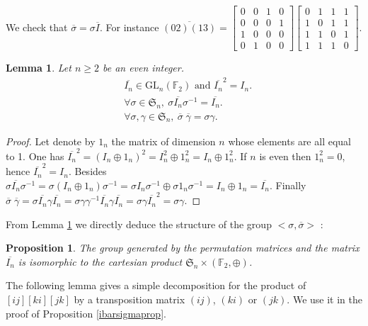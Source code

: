 \documentclass[a4paper,12pt,fleqn]{article}
\newcommand\F{\mathbb{F}}
\newcommand\SYM[1][n]{\mathfrak{S}_{#1}}
\newcommand\GL[1][n]{\mathrm{GL}_{#1}(\mathbb{F}_2)}
\renewcommand\geq{\geqslant}
\newtheorem{prop}[theo]{Proposition}
\newtheorem{lem}[theo]{Lemma}
\begin{document}
We check that $\overline{\sigma}=\sigma\overline{I}$. For instance $\overline{(02)(13)}=\begin{bmatrix}0&0&1&0\\0&0&0&1\\1&0&0&0\\0&1&0&0\end{bmatrix}\begin{bmatrix}0&1&1&1\\1&0&1&1\\1&1&0&1\\1&1&1&0\end{bmatrix}$.


\begin{lem}\label{ibar1}Let $n\geq  2$ be an even integer.  
  \begin{align}
    &\overline{I_n}\in\GL \text{ and } \overline{I_n}^2=I_n.\label{ibarinv}\\
    &\forall\sigma\in\SYM,\ \sigma\overline{I_n}\sigma^{-1}=\overline{I_n}.\label{ibarconj}\\
    &\forall\sigma,\gamma\in\SYM,\ \overline{\sigma}\;\overline{\gamma}=\sigma\gamma.\label{ibarprod}
  \end{align}
\end{lem}


\begin{proof}Let denote by $1_n$ the matrix of dimension $n$ whose elements are all equal to 1. One has
  $\overline{I_n}^2=(I_n\oplus 1_n)^2=I_n^2\oplus 1_n^2=I_n\oplus 1_n^2$. If $n$ is even then $1_n^2=0$, hence
  $\overline{I_n}^2=I_n.$
  Besides $\sigma\overline{I_n}\sigma^{-1}=\sigma(I_n\oplus 1_n)\sigma^{-1}=\sigma I_n\sigma^{-1}\oplus \sigma 1_n \sigma^{-1}=I_n\oplus 1_n=\overline{I_n}$.
  Finally $\overline{\sigma}\;\overline{\gamma}=\sigma\overline{I_n}\gamma\overline{I_n}=\sigma\gamma\gamma^{-1}\overline{I_n}\gamma\overline{I_n}=\sigma\gamma\overline{I_n}^2=\sigma\gamma$.
\end{proof}

From Lemma \ref{ibar1} we directly deduce the structure of the group $<\sigma,\overline{\sigma}>$ :

\begin{prop} The group generated by the permutation matrices and the matrix $\overline{I_n}$ is isomorphic to the cartesian
  product $\SYM\times (\F_2,\oplus)$.
\end{prop}


The following lemma  gives a simple decomposition for the product of $[ij][ki][jk]$ by a transposition matrix $(ij)$, $(ki)$ or $(jk)$. We use it in the proof of
Proposition \ref{ibarsigmaprop}.
\end{document}
